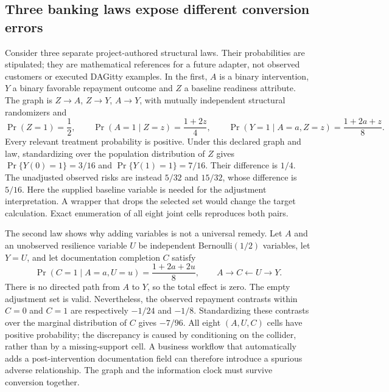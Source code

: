 \subsection{Three banking laws expose different conversion errors}
\label{exec18:gp-graph-laws}

Consider three separate project-authored structural laws. Their probabilities
are stipulated; they are mathematical references for a future adapter, not
observed customers or executed DAGitty examples. In the first, \(A\) is a
binary intervention, \(Y\) a binary favorable repayment outcome and \(Z\) a
baseline readiness attribute. The graph is \(Z\to A\), \(Z\to Y\),
\(A\to Y\), with mutually independent structural randomizers and
\begin{equation}
\label{exec18:gp-confounding}
 \Pr(Z=1)=\frac12,\qquad
 \Pr(A=1\mid Z=z)=\frac{1+2z}{4},\qquad
 \Pr(Y=1\mid A=a,Z=z)=\frac{1+2a+z}{8}.
\end{equation}
Every relevant treatment probability is positive. Under this declared graph
and law, standardizing over the population distribution of \(Z\) gives
\(\Pr\{Y(0)=1\}=3/16\) and \(\Pr\{Y(1)=1\}=7/16\). Their difference is
\(1/4\). The unadjusted observed risks are instead \(5/32\) and \(15/32\),
whose difference is \(5/16\). Here the supplied baseline variable is needed
for the adjustment interpretation. A wrapper that drops the selected set
would change the target calculation. Exact enumeration of all eight joint
cells reproduces both pairs. \citep{exec18_gp_graph_reference}

The second law shows why adding variables is not a universal remedy. Let
\(A\) and an unobserved resilience variable \(U\) be independent
Bernoulli\((1/2)\) variables, let \(Y=U\), and let documentation completion
\(C\) satisfy
\begin{equation}
\label{exec18:gp-collider}
 \Pr(C=1\mid A=a,U=u)=\frac{1+2a+2u}{8},
 \qquad A\to C\leftarrow U\to Y.
\end{equation}
There is no directed path from \(A\) to \(Y\), so the total effect is zero.
The empty adjustment set is valid. Nevertheless, the observed repayment
contrasts within \(C=0\) and \(C=1\) are respectively \(-1/24\) and
\(-1/8\). Standardizing these contrasts over the marginal distribution
of \(C\) gives \(-7/96\). All eight \((A,U,C)\) cells have positive probability;
the discrepancy is caused by conditioning on the collider, rather than by
a missing-support cell. A business workflow that automatically adds a
post-intervention documentation field can therefore introduce a spurious
adverse relationship. The graph and the information clock must survive
conversion together. \citep{exec18_gp_graph_reference}

